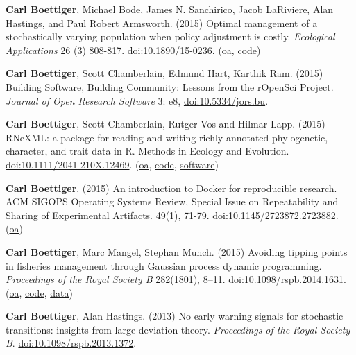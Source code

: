 \documentclass[10pt,sans]{moderncv}        %
\renewenvironment{enumerate}{\begin{etaremune}}{\end{etaremune}}
\begin{document}
\begin{enumerate}
\def\labelenumi{\arabic{enumi}.}
\item
  \textbf{Carl Boettiger}, Michael Bode, James N. Sanchirico, Jacob
  LaRiviere, Alan Hastings, and Paul Robert Armsworth. (2015) Optimal
  management of a stochastically varying population when policy
  adjustment is costly. \emph{Ecological Applications} 26 (3) 808-817.
  \href{http://dx.doi.org/10.1890/15-0236}{doi:10.1890/15-0236}.
  (\href{http://arxiv.org/pdf/1507.07037v1.pdf}{oa},
  \href{https://github.com/cboettig/pdg_control}{code})
\item
  \textbf{Carl Boettiger}, Scott Chamberlain, Edmund Hart, Karthik Ram.
  (2015) Building Software, Building Community: Lessons from the
  rOpenSci Project. \emph{Journal of Open Research Software} 3: e8,
  \href{http://dx.doi.org/10.5334/jors.bu}{doi:10.5334/jors.bu}.
\item
  \textbf{Carl Boettiger}, Scott Chamberlain, Rutger Vos and Hilmar
  Lapp. (2015) RNeXML: a package for reading and writing richly
  annotated phylogenetic, character, and trait data in R. Methods in
  Ecology and Evolution.
  \href{http://dx.doi.org/10.1111/2041-210X.12469}{doi:10.1111/2041-210X.12469}.
  (\href{http://arxiv.org/abs/1506.02722}{oa},
  \href{https://github.com/ropensci/RNeXML}{code},
  \href{http://cran.rstudio.com/web/packages/RNeXML}{software})
\item
  \textbf{Carl Boettiger}. (2015) An introduction to Docker for
  reproducible research. ACM SIGOPS Operating Systems Review, Special
  Issue on Repeatability and Sharing of Experimental Artifacts. 49(1),
  71-79.
  \href{http://dx.doi.org/10.1145/2723872.2723882}{doi:10.1145/2723872.2723882}.
  (\href{http://arxiv.org/abs/1410.0846}{oa})
\item
  \textbf{Carl Boettiger}, Marc Mangel, Stephan Munch. (2015) Avoiding
  tipping points in fisheries management through Gaussian process
  dynamic programming. \emph{Proceedings of the Royal Society B}
  282(1801), 8--11.
  \href{http://dx.doi.org/10.1098/rspb.2014.1631}{doi:10.1098/rspb.2014.1631}.
  (\href{http://arxiv.org/abs/1412.8081}{oa},
  \href{https://github.com/cboettig/nonparametric-bayes}{code},
  \href{http://dx.doi.org/10.5061/dryad.mj226}{data})
\item
  \textbf{Carl Boettiger}, Alan Hastings. (2013) No early warning
  signals for stochastic transitions: insights from large deviation
  theory. \emph{Proceedings of the Royal Society B}.
  \href{http://dx.doi.org/10.1098/rspb.2013.1372}{doi:10.1098/rspb.2013.1372}.

\end{enumerate}
\end{document}

